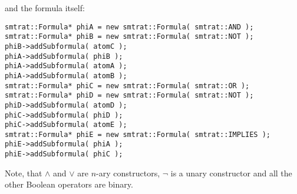 \normalsize
and the formula itself:
\scriptsize
\begin{verbatim}
smtrat::Formula* phiA = new smtrat::Formula( smtrat::AND );
smtrat::Formula* phiB = new smtrat::Formula( smtrat::NOT );
phiB->addSubformula( atomC );
phiA->addSubformula( phiB );
phiA->addSubformula( atomA );
phiA->addSubformula( atomB );
smtrat::Formula* phiC = new smtrat::Formula( smtrat::OR );
smtrat::Formula* phiD = new smtrat::Formula( smtrat::NOT );
phiD->addSubformula( atomD );
phiC->addSubformula( phiD );
phiC->addSubformula( atomE );
smtrat::Formula* phiE = new smtrat::Formula( smtrat::IMPLIES );
phiE->addSubformula( phiA );
phiE->addSubformula( phiC );
\end{verbatim}
\normalsize
Note, that $\land$ and $\lor$ are $n$-ary constructors, $\neg$ is a unary constructor and all the other Boolean operators are binary.

